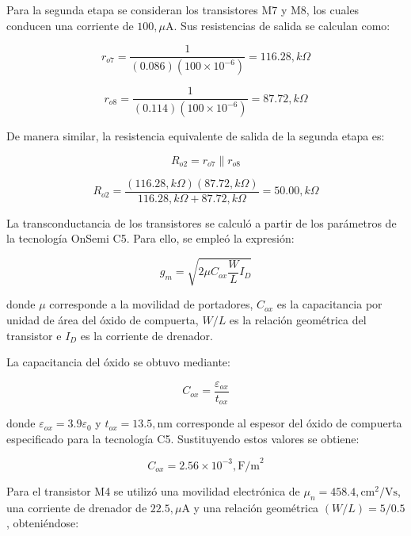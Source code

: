 \documentclass[journal]{IEEEtran}
\begin{document}
Para la segunda etapa se consideran los transistores M7 y M8, los cuales conducen una corriente de $100,\mu\text{A}$. Sus resistencias de salida se calculan como:

\begin{equation}
r_{o7}=
\frac{1}{(0.086)(100\times10^{-6})}
=116.28,k\Omega
\end{equation}

\begin{equation}
r_{o8}=
\frac{1}{(0.114)(100\times10^{-6})}
=87.72,k\Omega
\end{equation}

De manera similar, la resistencia equivalente de salida de la segunda etapa es:

\begin{equation}
R_{o2}=r_{o7}\parallel r_{o8}
\end{equation}

\begin{equation}
R_{o2}=
\frac{(116.28,k\Omega)(87.72,k\Omega)}
{116.28,k\Omega+87.72,k\Omega}
=50.00,k\Omega
\end{equation}

La transconductancia de los transistores se calculó a partir de los parámetros de la tecnología OnSemi C5. Para ello, se empleó la expresión:

\begin{equation}
g_m=\sqrt{2\mu C_{ox}\frac{W}{L}I_D}
\end{equation}

donde $\mu$ corresponde a la movilidad de portadores, $C_{ox}$ es la capacitancia por unidad de área del óxido de compuerta, $W/L$ es la relación geométrica del transistor e $I_D$ es la corriente de drenador.

La capacitancia del óxido se obtuvo mediante:

\begin{equation}
C_{ox}=\frac{\varepsilon_{ox}}{t_{ox}}
\end{equation}

donde $\varepsilon_{ox}=3.9\varepsilon_0$ y $t_{ox}=13.5,\text{nm}$ corresponde al espesor del óxido de compuerta especificado para la tecnología C5. Sustituyendo estos valores se obtiene:

\begin{equation}
C_{ox}=2.56\times10^{-3},\text{F/m}^2
\end{equation}

Para el transistor M4 se utilizó una movilidad electrónica de $\mu_n=458.4,\text{cm}^2/\text{Vs}$, una corriente de drenador de $22.5,\mu\text{A}$ y una relación geométrica $(W/L)=5/0.5$, obteniéndose:
\end{document}
